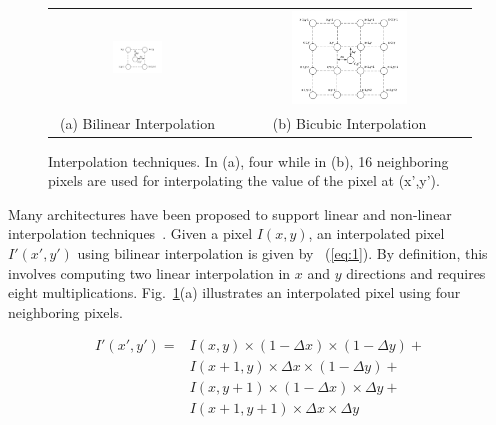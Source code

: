 \begin{figure}[!htb]
\centering
\begin{tabular}{@{}c@{} @{}c@{}}
\includegraphics[width=0.3\textwidth]{./figures/bilinear.pdf} & \includegraphics[width=0.5\textwidth]{./figures/bicubic.pdf}\\[\abovecaptionskip]
\small (a) Bilinear Interpolation & \small (b) Bicubic Interpolation
\end{tabular}
\vspace{1pt}
\caption{Interpolation techniques. In (a), four while in (b), 16 neighboring pixels are used for interpolating the value of the pixel at (x',y').}
\label{tab:interpolation}
\end{figure}

Many architectures have been proposed to support linear 
and non-linear interpolation techniques~\cite{kesturdac}.
Given a pixel $I(x,y)$, an interpolated pixel $I'(x',y')$ using bilinear interpolation is given by ~(\ref{eq:1}). By definition, 
this involves computing two linear interpolation in $x$ and $y$ directions and requires eight multiplications. 
Fig.~\ref{tab:interpolation}(a) illustrates an interpolated pixel using four neighboring pixels.

\begin{equation}
\begin{split}
I'(x',y') = &I(x,y) \times (1-\Delta x) \times (1-\Delta y) +\\ 
            &I(x+1,y) \times\Delta x \times (1-\Delta y) +\\ 
            &I(x,y+1) \times (1-\Delta x) \times\Delta y +\\ 
            &I(x+1,y+1) \times\Delta x \times\Delta y 
\end{split}
\label{eq:1}
\end{equation}

